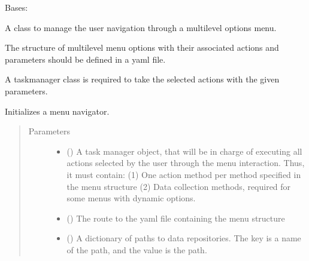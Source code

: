 \documentclass[letterpaper,10pt,english]{sphinxmanual}
\begin{document}
\begin{fulllineitems}
\label{\detokenize{mn_menu_navigator:src.menu_navigator.menu_navigator.MenuNavigator}}
\sphinxAtStartPar
Bases: 

\sphinxAtStartPar
A class to manage the user navigation through a multilevel options menu.

\sphinxAtStartPar
The structure of multilevel menu options with their associated
actions and parameters should be defined in a yaml file.

\sphinxAtStartPar
A taskmanager class is required to take the selected actions with the
given parameters.

\begin{fulllineitems}
\label{\detokenize{mn_menu_navigator:src.menu_navigator.menu_navigator.MenuNavigator.__init__}}
\sphinxAtStartPar
Initializes a menu navigator.
\begin{quote}\begin{description}
\item[{Parameters}] \leavevmode\begin{itemize}
\item {} 
\sphinxAtStartPar
{} () \textendash{} A task manager object, that will be in charge of executing all
actions selected by the user through the menu interaction. Thus, it
must contain:
(1) One action method per method specified in the menu structure
(2) Data collection methods, required for some menus with dynamic
options.

\item {} 
\sphinxAtStartPar
{} () \textendash{} The route to the yaml file containing the menu structure

\item {} 
\sphinxAtStartPar
{} () \textendash{} A dictionary of paths to data repositories. The key is a name of
the path, and the value is the path.


\end{itemize}
\end{description}
\end{quote}
\end{fulllineitems}
\end{fulllineitems}
\end{document}
